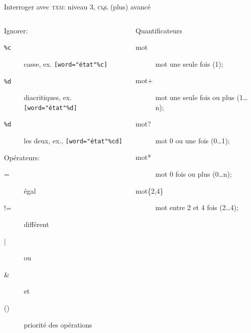 \documentclass{beamer}
\begin{document}
\begin{frame}{Interroger avec \textsc{txm}: niveau 3, \textsc{cql} (plus) avancé}

\begin{columns}
	\begin{column}{0.48\textwidth}
		
		\begin{block}{Ignorer:}
			\begin{description}
				\item[\texttt{\%c}] casse, ex. \texttt{[word="état"\%c]}
				\item[\texttt{\%d}] diacritiques, ex. \texttt{[word="état"\%d]}
				\item[\texttt{\%d}] les deux, ex., \texttt{[word="état"\%cd]}
			\end{description}
		\end{block}

		\begin{block}{Opérateurs:}
			\begin{description}
				\item[=] égal
				\item[!=] différent
				\item[|] ou
				\item[\&] et
				\item[()] priorité des opérations
			\end{description}
		\end{block}		
		
	\end{column}
	\begin{column}{0.48\textwidth}
	
	\begin{block}{Quantificateurs}
		\begin{description}
			\item[mot] mot une seule fois (1);
			\item[mot+] mot une seule fois ou plus (1…n);
			\item[mot?] mot 0 ou une fois (0…1);
			\item[mot*] mot 0 fois ou plus (0…n);
			\item[mot\{2,4\}] mot entre 2 et 4 fois (2…4);
		\end{description}
	\end{block}
		
	\end{column}
\end{columns}


\end{frame}
\end{document}
